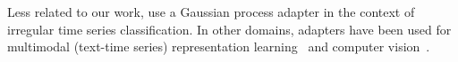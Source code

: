 Less related to our work, \citet{cheng2016_gpadapter} use a Gaussian process adapter in the context of irregular time series classification. In other domains, adapters have been used for multimodal (text-time series) representation learning~\citep{zhang2024dualtimedualadaptermultimodallanguage} and computer vision~\citep{LI2025, yin2023adapterneedtuningvisual, pan2022}.














    
    
